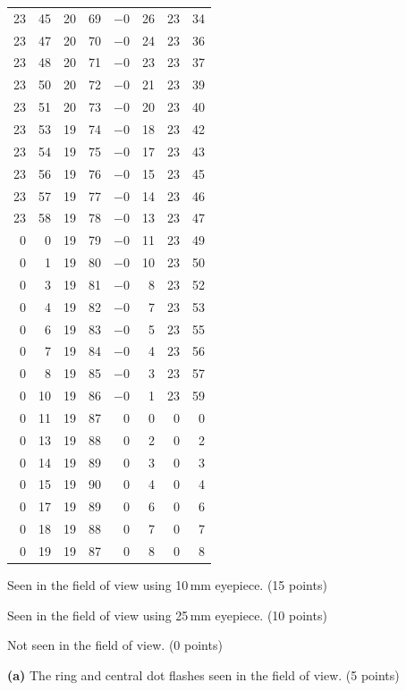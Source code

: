 \begin{center}
\begin{longtable}{rr c c rr rr}
23 & 45 & 20 & 69 & $-0$ & 26 & 23 & 34 \\
23 & 47 & 20 & 70 & $-0$ & 24 & 23 & 36 \\
23 & 48 & 20 & 71 & $-0$ & 23 & 23 & 37 \\
23 & 50 & 20 & 72 & $-0$ & 21 & 23 & 39 \\
23 & 51 & 20 & 73 & $-0$ & 20 & 23 & 40 \\
23 & 53 & 19 & 74 & $-0$ & 18 & 23 & 42 \\
23 & 54 & 19 & 75 & $-0$ & 17 & 23 & 43 \\
23 & 56 & 19 & 76 & $-0$ & 15 & 23 & 45 \\
23 & 57 & 19 & 77 & $-0$ & 14 & 23 & 46 \\
23 & 58 & 19 & 78 & $-0$ & 13 & 23 & 47 \\
0 & 0 & 19 & 79 & $-0$ & 11 & 23 & 49 \\
0 & 1 & 19 & 80 & $-0$ & 10 & 23 & 50 \\
0 & 3 & 19 & 81 & $-0$ & 8 & 23 & 52 \\
0 & 4 & 19 & 82 & $-0$ & 7 & 23 & 53 \\
0 & 6 & 19 & 83 & $-0$ & 5 & 23 & 55 \\
0 & 7 & 19 & 84 & $-0$ & 4 & 23 & 56 \\
0 & 8 & 19 & 85 & $-0$ & 3 & 23 & 57 \\
0 & 10 & 19 & 86 & $-0$ & 1 & 23 & 59 \\
0 & 11 & 19 & 87 & 0 & 0 & 0 & 0 \\
0 & 13 & 19 & 88 & 0 & 2 & 0 & 2 \\
0 & 14 & 19 & 89 & 0 & 3 & 0 & 3 \\
0 & 15 & 19 & 90 & 0 & 4 & 0 & 4 \\
0 & 17 & 19 & 89 & 0 & 6 & 0 & 6 \\
0 & 18 & 19 & 88 & 0 & 7 & 0 & 7 \\
0 & 19 & 19 & 87 & 0 & 8 & 0 & 8 \\
\end{longtable}
\end{center}

Seen in the field of view using 10\,mm eyepiece. \hfill(15 points)

Seen in the field of view using 25\,mm eyepiece. \hfill(10 points)

Not seen in the field of view. \hfill(0 points)

\textbf{(a)} The ring and central dot flashes seen in the field of view.
\hfill(5 points)

